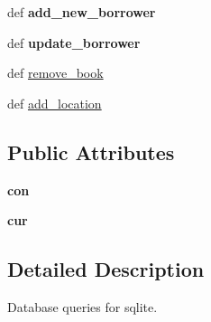 \begin{DoxyCompactItemize}
\item 
\hypertarget{classsrc_1_1db__queries_1_1sqlite_abd29479bee0f35564e3f5737f5c3b564}{
def {\bfseries add\_\-new\_\-borrower}}
\label{classsrc_1_1db__queries_1_1sqlite_abd29479bee0f35564e3f5737f5c3b564}

\item 
\hypertarget{classsrc_1_1db__queries_1_1sqlite_adf0fd3aeef982754e149c636e6aec18f}{
def {\bfseries update\_\-borrower}}
\label{classsrc_1_1db__queries_1_1sqlite_adf0fd3aeef982754e149c636e6aec18f}

\item 
def \hyperlink{classsrc_1_1db__queries_1_1sqlite_a4253955a4622883271aff0fbf9c28468}{remove\_\-book}
\item 
def \hyperlink{classsrc_1_1db__queries_1_1sqlite_ab0a41a32c9c35d54b874ad179e5112d3}{add\_\-location}
\end{DoxyCompactItemize}
\subsection*{Public Attributes}
\begin{DoxyCompactItemize}
\item 
\hypertarget{classsrc_1_1db__queries_1_1sqlite_a0f6073448700a10c82addd69c471168a}{
{\bfseries con}}
\label{classsrc_1_1db__queries_1_1sqlite_a0f6073448700a10c82addd69c471168a}

\item 
\hypertarget{classsrc_1_1db__queries_1_1sqlite_a5f38afee85b01b1c3281375be2ceaeaa}{
{\bfseries cur}}
\label{classsrc_1_1db__queries_1_1sqlite_a5f38afee85b01b1c3281375be2ceaeaa}

\end{DoxyCompactItemize}


\subsection{Detailed Description}
\begin{DoxyVerb}
Database queries for sqlite.

\end{DoxyVerb}
 

